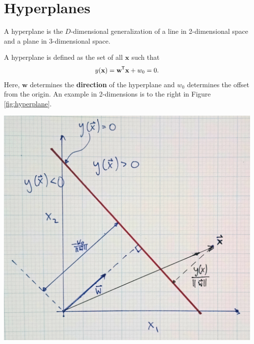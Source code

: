 \documentclass[11pt]{article}
\newcommand{\xb}{\mathbf{x}}
\newcommand*{\tran}{^{\mkern-1.5mu\mathsf{T}}}
\begin{document}
\section{Hyperplanes}
\begin{minipage}{0.575 \textwidth}
A hyperplane is the $D$-dimensional generalization of a line in 2-dimensional space and a plane in 3-dimensional space.

A hyperplane is defined as the set of all $\xb$ such that
\begin{equation}
	y(\xb) = \mathbf{w}\tran \xb + w_0 = 0.
	\label{eqn:hyperplane}
\end{equation}
Here, $\mathbf{w}$ determines the \textbf{direction} of the hyperplane and $w_0$ determines the offset from the origin. 
An example in 2-dimensions is to the right in Figure \ref{fig:hyperplane}.
\end{minipage}\hfill
\begin{minipage}{0.4 \textwidth}
\includegraphics[width=\textwidth]{Figure4-Hyperplane.jpg}
\label{fig:hyperplane}
\end{minipage}
\end{document}
